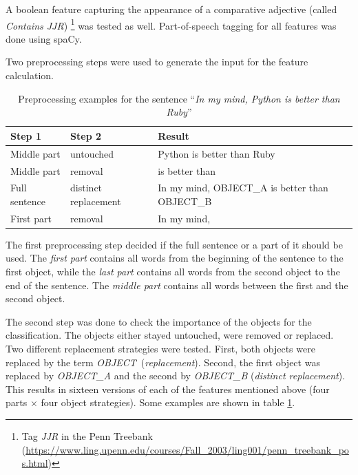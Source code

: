 A boolean feature capturing the appearance of a comparative adjective (called \emph{Contains JJR}) \footnote{Tag \emph{JJR} in the Penn Treebank (\url{https://www.ling.upenn.edu/courses/Fall\_2003/ling001/penn\_treebank\_pos.html})} was tested as well. Part-of-speech tagging for all features was done using spaCy.\newline

Two preprocessing steps were used to generate the input for the feature calculation.

\begin{table}[ht]
\centering

\caption{Preprocessing examples for the sentence \enquote{\emph{In my mind, Python is better than Ruby}}}
\label{preprocessing_example}
\begin{tabularx}{\linewidth}{llX}
\toprule
Step 1 & Step 2 & Result \\ \midrule
Middle part & untouched & Python is better than Ruby \\
Middle part & removal & is better than \\
Full sentence & distinct replacement &In my mind, OBJECT\_A is better than OBJECT\_B \\
First part & removal & In my mind, \\
\bottomrule
\end{tabularx}

\end{table}

The first preprocessing step decided if the full sentence or a part of it should be used. The \emph{first part} contains all words from the beginning of the sentence to the first object, while the \emph{last part} contains all words from the second object to the end of the sentence. The \emph{middle part} contains all words between the first and the second object.

The second step was done to check the importance of the objects for the classification. The objects either stayed untouched, were removed or replaced. Two different replacement strategies were tested. First, both objects were replaced by the term \mbox{\emph{OBJECT} (\emph{replacement})}. Second, the first object was replaced by \emph{OBJECT\_A} and the second by \emph{OBJECT\_B} (\emph{distinct replacement}). This results in sixteen versions of each of the features mentioned above (four parts $\times$ four object strategies). Some examples are shown in table \ref{preprocessing_example}.\newline


